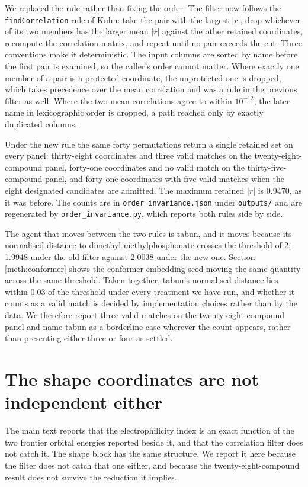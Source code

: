 \documentclass[11pt,a4paper]{article}
\begin{document}
We replaced the rule rather than fixing the order. The filter now follows the
\texttt{findCorrelation} rule of Kuhn\cite{caretref}: take the pair with the
largest $|r|$, drop whichever of its two members has the larger mean $|r|$
against the other retained coordinates, recompute the correlation matrix, and
repeat until no pair exceeds the cut. Three conventions make it deterministic.
The input columns are sorted by name before the first pair is examined, so the
caller's order cannot matter. Where exactly one member of a pair is a protected
coordinate, the unprotected one is dropped, which takes precedence over the mean
correlation and was a rule in the previous filter as well. Where the two mean
correlations agree to within $10^{-12}$, the later name in lexicographic order
is dropped, a path reached only by exactly duplicated columns.

Under the new rule the same forty permutations return a single retained set on
every panel: thirty-eight coordinates and three valid matches on the
twenty-eight-compound panel, forty-one coordinates and no valid match on the
thirty-five-compound panel, and forty-one coordinates with five valid matches
when the eight designated candidates are admitted. The maximum
retained $|r|$ is 0.9470, as it was before. The counts are in
\texttt{order\_\allowbreak invariance.json} under \texttt{outputs/} and are regenerated by
\texttt{order\_\allowbreak invariance.py}, which reports both rules side by side.

The agent that moves between the two rules is tabun, and it moves because its
normalised distance to dimethyl methylphosphonate crosses the threshold of 2:
1.9948 under the old filter against 2.0038 under the new one. Section
\ref{meth:conformer} shows the conformer embedding seed moving the same quantity
across the same threshold. Taken together, tabun's normalised distance lies
within 0.03 of the threshold under every treatment we have run, and whether it
counts as a valid match is decided by implementation choices rather than by the
data. We therefore report three valid matches on the twenty-eight-compound panel
and name tabun as a borderline case wherever the count appears, rather than
presenting either three or four as settled.

\section{The shape coordinates are not independent either}
\label{meth:shape}

The main text reports that the electrophilicity index is an exact function
of the two frontier orbital energies reported beside it, and that the
correlation filter does not catch it. The shape block has the same structure.
We report it here because the filter does not catch that one either, and
because the twenty-eight-compound result does not survive the reduction it
implies.
\end{document}
